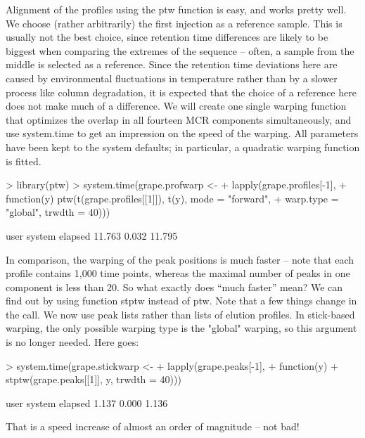 \documentclass[a4paper,11pt]{article}
\newcommand{\code}[1]{{\ttfamily #1}}
\begin{document}
Alignment of the profiles using the ptw function is easy, and works
pretty well. We choose (rather arbitrarily) the first injection as a
reference sample. This is usually not the best choice, since retention
time differences are likely to be biggest when comparing the extremes
of the sequence -- often, a sample from the middle is selected as a
reference. Since the retention time deviations here are caused by
environmental fluctuations in temperature rather than by a slower
process like column degradation, it is expected that the choice of a
reference here does not make much of a difference. We will create one
single warping function that optimizes the overlap in all fourteen MCR
components simultaneously, and use \code{system.time} to get an
impression on the speed of the warping. All parameters have been kept
to the system defaults; in particular, a quadratic warping function is
fitted.
\begin{Schunk}
\begin{Sinput}
> library(ptw)
> system.time(grape.profwarp <- 
+   lapply(grape.profiles[-1],
+          function(y) ptw(t(grape.profiles[[1]]), t(y), mode = "forward",
+                          warp.type = "global", trwdth = 40)))
\end{Sinput}
\begin{Soutput}
   user  system elapsed 
 11.763   0.032  11.795 
\end{Soutput}
\end{Schunk}

In comparison, the warping of the peak positions is much faster --
note that each profile contains 1,000 time points, whereas the maximal
number of peaks in one component is less than 20. So what exactly does
``much faster'' mean? We can find out by using function \code{stptw}
instead of \code{ptw}. Note that a few things change in the
call. We now use peak lists rather than lists of elution
profiles. In stick-based warping, the only possible warping type is
the \code{"global"} warping, so this argument is no longer
needed. Here goes: 
\begin{Schunk}
\begin{Sinput}
> system.time(grape.stickwarp <- 
+   lapply(grape.peaks[-1], 
+          function(y) 
+            stptw(grape.peaks[[1]], y, trwdth = 40)))
\end{Sinput}
\begin{Soutput}
   user  system elapsed 
  1.137   0.000   1.136 
\end{Soutput}
\end{Schunk}
That is a speed increase of almost an order of magnitude -- not bad!
\end{document}
